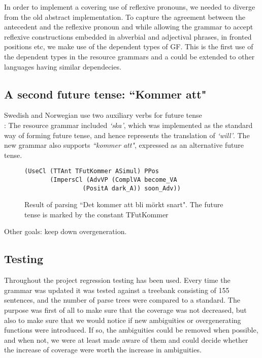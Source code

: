 \documentclass[10pt, a4paper]{article}
\begin{document}
In order to implement a covering use of reflexive pronouns, we needed to diverge
from the old abstract implementation. To capture the agreement between the
antecedent and the reflexive pronoun and while allowing the grammar to accept reflexive
constructions embedded in abverbial and adjectival phrases, in fronted positions etc,
we make use of the dependent types of GF. This is the first use of the dependent
types in the resource grammars and a could be extended to other languages having
similar dependecies.

\subsection{A second future tense: ``Kommer att"}
Swedish and Norwegian use two auxiliary verbs for future tense \\
\cite[p. 246]{H&H}:
The resource grammar included 
\emph{`ska'}, which was implemented as the standard way of forming future
tense, and hence represents the translation of
\emph{`will'}. 
The new grammar also supports \emph{``kommer att"}, expressed as an alternative
future tense.
\begin{figure}[h]
\begin{verbatim}
(UseCl (TTAnt TFutKommer ASimul) PPos 
       (ImpersCl (AdvVP (ComplVA become_VA 
                (PositA dark_A)) soon_Adv))
\end{verbatim}
\caption{Result of parsing ``Det kommer att bli m{\"o}rkt snart". The future tense
         is marked by the constant TFutKommer}
  \label{fig:kommeratt}
\end{figure}

Other goals: keep down overgeneration.
\subsection{Testing}
Throughout the project regression testing has been used. Every time the grammar was updated
it was tested against a treebank consisting of 155 sentences, and the number of
parse trees were compared to a standard.
The purpose was first of all to
make sure that the coverage was not decreased, but also to make sure that we
would notice if new ambiguities or overgenerating functions were introduced.
If so, the ambiguities could be removed when possible, and when not, we were at least made
aware of them and could decide whether the increase of coverage were worth the
increase in ambiguities.
\end{document}
